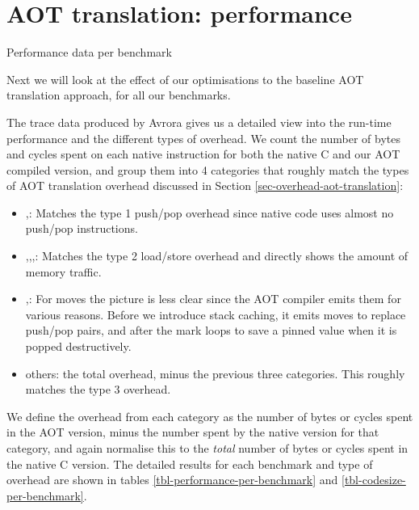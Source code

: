 \section{AOT translation: performance}
\label{sec-evaluation-aot-translation-performance}
\begin{table}[]
 \centering
 \caption{Performance data per benchmark}
 \label{tbl-performance-per-benchmark}
 \small
 \scriptsize
 \setlength{\tabcolsep}{4pt}
 
 \setlength{\tabcolsep}{6pt}
\end{table}

Next we will look at the effect of our optimisations to the baseline AOT translation approach, for all our benchmarks.

The trace data produced by Avrora gives us a detailed view into the run-time performance and the different types of overhead. We count the number of bytes and cycles spent on each native instruction for both the native C and our AOT compiled version, and group them into 4 categories that roughly match the types of AOT translation overhead discussed in Section \ref{sec-overhead-aot-translation}:
\begin{itemize}
	\item {},: Matches the type 1 push/pop overhead since native code uses almost no push/pop instructions.
	\item {},,,: Matches the type 2 load/store overhead and directly shows the amount of memory traffic.
	\item {},: For moves the picture is less clear since the AOT compiler emits them for various reasons. Before we introduce stack caching, it emits moves to replace push/pop pairs, and after the mark loops to save a pinned value when it is popped destructively.
	\item others: the total overhead, minus the previous three categories. This roughly matches the type 3 overhead.
\end{itemize}

We define the overhead from each category as the number of bytes or cycles spent in the AOT version, minus the number spent by the native version for that category, and again normalise this to the \emph{total} number of bytes or cycles spent in the native C version. The detailed results for each benchmark and type of overhead are shown in tables \ref{tbl-performance-per-benchmark} and \ref{tbl-codesize-per-benchmark}.

